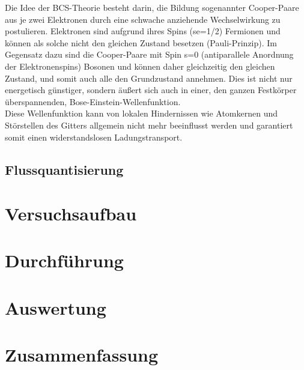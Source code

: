 \documentclass[12pt]{article}
\begin{document}
Die Idee der BCS-Theorie besteht darin, die Bildung sogenannter Cooper-Paare aus je zwei Elektronen durch eine schwache anziehende Wechselwirkung zu postulieren. Elektronen sind aufgrund ihres Spins (se=1/2) Fermionen und können als solche nicht den gleichen Zustand besetzen (Pauli-Prinzip). Im Gegensatz dazu sind die Cooper-Paare mit Spin s=0 (antiparallele Anordnung der Elektronenspins) Bosonen und können daher gleichzeitig den gleichen Zustand, und somit auch alle den Grundzustand annehmen. Dies ist nicht nur energetisch günstiger, sondern äußert sich auch in einer, den ganzen Festkörper überspannenden, Bose-Einstein-Wellenfunktion.\\

Diese Wellenfunktion kann von lokalen Hindernissen wie Atomkernen und Störstellen des Gitters allgemein nicht mehr beeinflusst werden und garantiert somit einen widerstandslosen Ladungstransport.

\subsection{Flussquantisierung}
\label{flussquantisierung}


\section{Versuchsaufbau}

\section{Durchführung}

\section{Auswertung}

\section{Zusammenfassung}
\end{document}
